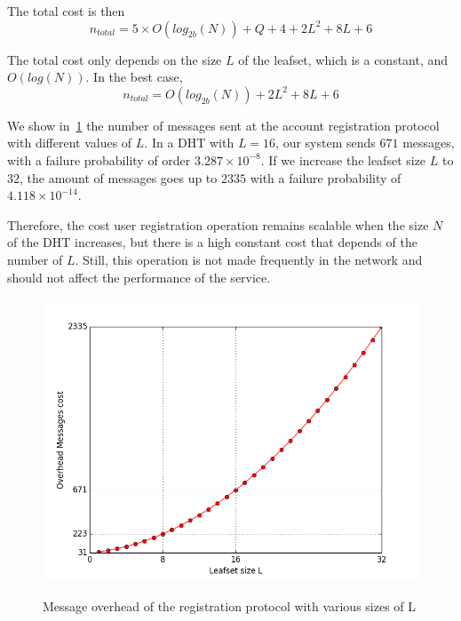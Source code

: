      The total cost is then
    $$
      n_{total} = 5 \times O(log_{2b}(N)) + Q + 4 + 2L^2 + 8L + 6
    $$    

    The total cost only depends on the size $L$ of the leafset, which is a
constant, and $O(log(N))$. In the best case, 
    $$
      n_{total} = O(log_{2b}(N)) + 2L^2 + 8L + 6
    $$

    We show in~\ref{fig:registration_messages} the number of messages sent at
    the account registration protocol with different values of $L$. In a DHT with
    $L = 16$, our system sends $671$ messages, with a failure probability of
    order $3.287 \times 10^{-8}$. If we increase the leafset size $L$ to $32$, the amount of
    messages goes up to $2335$ with a failure probability of $4.118 \times 10^{-14}$.
  
    Therefore, the cost user registration operation remains scalable when the
    size $N$ of the DHT increases, but there is a high constant cost that
    depends of the number of $L$. Still, this operation is not made frequently
    in the network and should not affect the performance of the
    service.

\begin{figure}[!htb]
\centering
\includegraphics[width=14cm]{../plots/account_registration_messages}\\
\caption{Message overhead of the registration protocol with various sizes of L}
\label{fig:registration_messages}
\end{figure}


